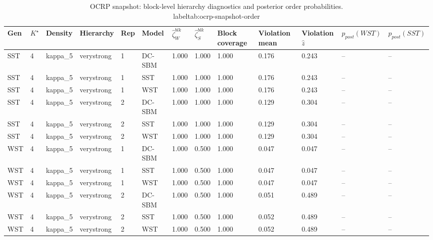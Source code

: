 \begin{table}[!h]
\centering
\caption{OCRP snapshot: block-level hierarchy diagnostics and posterior order probabilities.\\label{tab:ocrp-snapshot-order}}
\centering
\begin{tabular}[t]{lllllllllllll}
\toprule
Gen & $K^\star$ & Density & Hierarchy & Rep & Model & $\widehat\zeta_W^{blk}$ & $\widehat\zeta_S^{blk}$ & Block coverage & Violation mean & Violation $\hat z$ & $p_{post}(WST)$ & $p_{post}(SST)$\\
\midrule
SST & 4 & kappa_5 & verystrong & 1 & DC-SBM & 1.000 & 1.000 & 1.000 & 0.176 & 0.243 & -- & --\\
SST & 4 & kappa_5 & verystrong & 1 & SST & 1.000 & 1.000 & 1.000 & 0.176 & 0.243 & -- & --\\
SST & 4 & kappa_5 & verystrong & 1 & WST & 1.000 & 1.000 & 1.000 & 0.176 & 0.243 & -- & --\\
SST & 4 & kappa_5 & verystrong & 2 & DC-SBM & 1.000 & 1.000 & 1.000 & 0.129 & 0.304 & -- & --\\
SST & 4 & kappa_5 & verystrong & 2 & SST & 1.000 & 1.000 & 1.000 & 0.129 & 0.304 & -- & --\\
SST & 4 & kappa_5 & verystrong & 2 & WST & 1.000 & 1.000 & 1.000 & 0.129 & 0.304 & -- & --\\
WST & 4 & kappa_5 & verystrong & 1 & DC-SBM & 1.000 & 0.500 & 1.000 & 0.047 & 0.047 & -- & --\\
WST & 4 & kappa_5 & verystrong & 1 & SST & 1.000 & 0.500 & 1.000 & 0.047 & 0.047 & -- & --\\
WST & 4 & kappa_5 & verystrong & 1 & WST & 1.000 & 0.500 & 1.000 & 0.047 & 0.047 & -- & --\\
WST & 4 & kappa_5 & verystrong & 2 & DC-SBM & 1.000 & 0.500 & 1.000 & 0.051 & 0.489 & -- & --\\
WST & 4 & kappa_5 & verystrong & 2 & SST & 1.000 & 0.500 & 1.000 & 0.052 & 0.489 & -- & --\\
WST & 4 & kappa_5 & verystrong & 2 & WST & 1.000 & 0.500 & 1.000 & 0.052 & 0.489 & -- & --\\
\bottomrule
\end{tabular}
\end{table}
